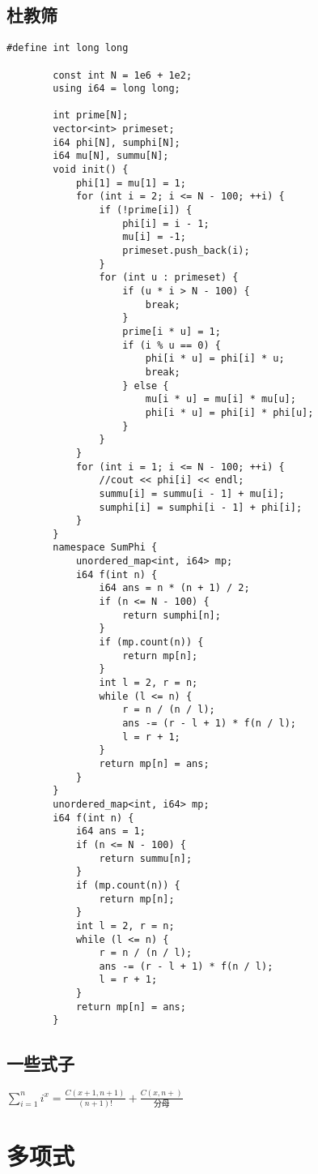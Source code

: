 \documentclass[12pt, a4paper]{ctexart}
\begin{document}
	\subsection{杜教筛}
	\begin{lstlisting}[caption={}]
		#define int long long
		
		const int N = 1e6 + 1e2;
		using i64 = long long;
		
		int prime[N];
		vector<int> primeset;
		i64 phi[N], sumphi[N];
		i64 mu[N], summu[N];
		void init() {
			phi[1] = mu[1] = 1;
			for (int i = 2; i <= N - 100; ++i) {
				if (!prime[i]) {
					phi[i] = i - 1;
					mu[i] = -1;
					primeset.push_back(i);
				}
				for (int u : primeset) {
					if (u * i > N - 100) {
						break;
					}
					prime[i * u] = 1;
					if (i % u == 0) {
						phi[i * u] = phi[i] * u;
						break;
					} else {
						mu[i * u] = mu[i] * mu[u];
						phi[i * u] = phi[i] * phi[u];
					}
				}
			}
			for (int i = 1; i <= N - 100; ++i) {
				//cout << phi[i] << endl;
				summu[i] = summu[i - 1] + mu[i];
				sumphi[i] = sumphi[i - 1] + phi[i];
			}
		}
		namespace SumPhi {
			unordered_map<int, i64> mp;
			i64 f(int n) {
				i64 ans = n * (n + 1) / 2;
				if (n <= N - 100) {
					return sumphi[n];
				}
				if (mp.count(n)) {
					return mp[n];
				}
				int l = 2, r = n;
				while (l <= n) {
					r = n / (n / l);
					ans -= (r - l + 1) * f(n / l);
					l = r + 1;
				}
				return mp[n] = ans;
			}
		}
		unordered_map<int, i64> mp;
		i64 f(int n) {
			i64 ans = 1;
			if (n <= N - 100) {
				return summu[n];
			}
			if (mp.count(n)) {
				return mp[n];
			}
			int l = 2, r = n;
			while (l <= n) {
				r = n / (n / l);
				ans -= (r - l + 1) * f(n / l);
				l = r + 1;
			}
			return mp[n] = ans;
		}
	\end{lstlisting}
	\subsection{一些式子}
	$\sum_{i = 1}^{n} i ^ x = \frac{C(x + 1, n + 1)}{(n + 1)!} + \frac{C(x, n + )}{分母}$
	
	
	\section{多项式}
\end{document}
